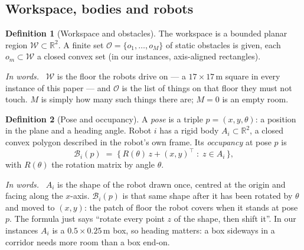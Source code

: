 \documentclass[conference]{IEEEtran}
\theoremstyle{plain}
\theoremstyle{definition}
\newtheorem{definition}{Definition}
\newcommand{\inwords}{\par\smallskip\noindent\textit{In words.}\ }
\newcommand{\R}{\mathbb{R}}
\newcommand{\W}{\mathcal{W}}
\newcommand{\Obs}{\mathcal{O}}
\newcommand{\Bod}{\mathcal{B}}
\begin{document}
\subsection{Workspace, bodies and robots}
\label{sec:prelim-world}

\begin{definition}[Workspace and obstacles]
The workspace is a bounded planar region $\W \subset \R^2$. A finite set
$\Obs = \{o_1,\dots,o_M\}$ of static obstacles is given, each $o_m \subset \W$ a closed
convex set (in our instances, axis-aligned rectangles).
\inwords
$\W$ is the floor the robots drive on --- a $17 \times 17$\,m square in every instance of
this paper --- and $\Obs$ is the list of things on that floor they must not touch. $M$ is
simply how many such things there are; $M = 0$ is an empty room.
\end{definition}

\begin{definition}[Pose and occupancy]
A \emph{pose} is a triple $p = (x,y,\theta)$: a position in the plane and a heading angle.
Robot $i$ has a rigid body $A_i \subset \R^2$, a closed convex polygon described in the
robot's own frame. Its \emph{occupancy} at pose $p$ is
\[
  \Bod_i(p) \;=\; \{\, R(\theta)\,z + (x,y)^{\!\top} \;:\; z \in A_i \,\},
\]
with $R(\theta)$ the rotation matrix by angle $\theta$.
\inwords
$A_i$ is the shape of the robot drawn once, centred at the origin and facing along the
$x$-axis. $\Bod_i(p)$ is that same shape after it has been rotated by $\theta$ and moved to
$(x,y)$: the patch of floor the robot covers when it stands at pose $p$. The formula just says
``rotate every point $z$ of the shape, then shift it''. In our instances $A_i$ is a
$0.5 \times 0.25$\,m box, so heading matters: a box sideways in a corridor needs more room
than a box end-on.
\end{definition}
\end{document}
